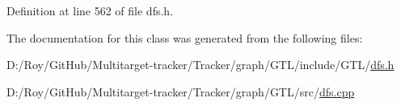 Definition at line 562 of file dfs.\+h.



The documentation for this class was generated from the following files\+:\begin{DoxyCompactItemize}
\item 
D\+:/\+Roy/\+Git\+Hub/\+Multitarget-\/tracker/\+Tracker/graph/\+G\+T\+L/include/\+G\+T\+L/\mbox{\hyperlink{dfs_8h}{dfs.\+h}}\item 
D\+:/\+Roy/\+Git\+Hub/\+Multitarget-\/tracker/\+Tracker/graph/\+G\+T\+L/src/\mbox{\hyperlink{dfs_8cpp}{dfs.\+cpp}}\end{DoxyCompactItemize}

